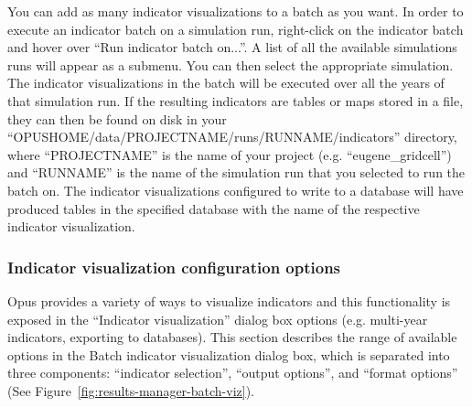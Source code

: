 You can add as many indicator visualizations to a batch as you want. In
order to execute an indicator batch on a simulation run, right-click on
the indicator batch and hover over
 ``Run indicator batch on...''. A list of all the available simulations
 runs will
appear as a submenu. You can then select the appropriate simulation.
The indicator visualizations in the batch will be executed over all the
years of that simulation run. If the resulting indicators are tables or
maps stored in a file, they can then be found on disk in your
``OPUSHOME/data/PROJECTNAME/runs/RUNNAME/indicators'' directory, where
``PROJECTNAME'' is the name of your project (e.g.
 ``eugene\_gridcell'') and ``RUNNAME'' is the name of the
simulation run that you selected to run the batch on. The indicator
visualizations configured to write to a database will have produced
tables in the specified database with the name of the respective
indicator visualization.



\subsubsection{Indicator visualization configuration options}
\label{sect:indicator-visualization-options}

Opus provides a variety of ways to visualize indicators and this
functionality is exposed in the ``Indicator visualization'' dialog
box options (e.g. multi-year indicators, exporting to
databases). This section describes the range
of available options in the Batch indicator visualization dialog
box, which is separated into three components:  ``indicator
selection'',  ``output options'', and  ``format options'' (See
Figure~\ref{fig:results-manager-batch-viz}). 

